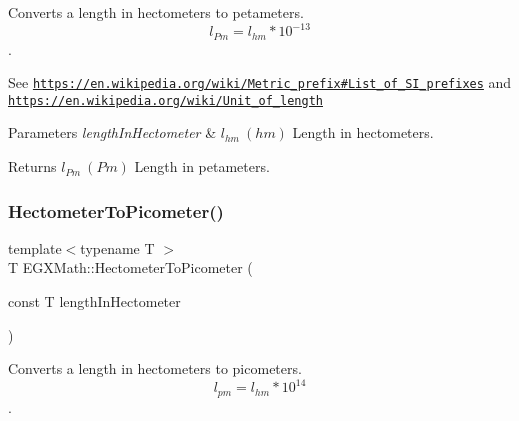 Converts a length in hectometers to petameters. \[ l_{Pm}=l_{hm} * 10^{-13} \]. 

See \href{https://en.wikipedia.org/wiki/Metric_prefix#List_of_SI_prefixes}{\tt https\+://en.\+wikipedia.\+org/wiki/\+Metric\+\_\+prefix\#\+List\+\_\+of\+\_\+\+S\+I\+\_\+prefixes} and \href{https://en.wikipedia.org/wiki/Unit_of_length}{\tt https\+://en.\+wikipedia.\+org/wiki/\+Unit\+\_\+of\+\_\+length} 
\begin{DoxyParams}{Parameters}
{\em length\+In\+Hectometer} & $ l_{hm}\ (hm)$ Length in hectometers. \\
\hline
\end{DoxyParams}
\begin{DoxyReturn}{Returns}
$ l_{Pm}\ (Pm)$ Length in petameters. 
\end{DoxyReturn}
\mbox{\label{group___e_g_x_math-_conversions-_length_conversions-_hectometer-_s_i_gaa45a09cd750ee4e48680332f0ce39f07}} 
\subsubsection{\texorpdfstring{Hectometer\+To\+Picometer()}{HectometerToPicometer()}}
{\footnotesize\ttfamily template$<$typename T $>$ \\
T E\+G\+X\+Math\+::\+Hectometer\+To\+Picometer (\begin{DoxyParamCaption}\item[{const T}]{length\+In\+Hectometer }\end{DoxyParamCaption})}



Converts a length in hectometers to picometers. \[ l_{pm}=l_{hm} * 10^{14} \]. 

